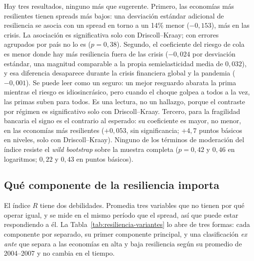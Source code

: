 Hay tres resultados, ninguno más que sugerente. Primero, las economías más resilientes tienen spreads más bajos: una desviación estándar adicional de resiliencia se asocia con un spread en torno a un 14\% menor ($-0{,}153$), más en las crisis. La asociación es significativa solo con Driscoll--Kraay; con errores agrupados por país no lo es ($p=0{,}38$). Segundo, el coeficiente del riesgo de cola es menor donde hay más resiliencia fuera de las crisis ($-0{,}024$ por desviación estándar, una magnitud comparable a la propia semielasticidad media de $0{,}032$), y esa diferencia desaparece durante la crisis financiera global y la pandemia ($-0{,}001$). Se puede leer como un seguro: un mejor resguardo abarata la prima mientras el riesgo es idiosincrásico, pero cuando el choque golpea a todos a la vez, las primas suben para todos. Es una lectura, no un hallazgo, porque el contraste por régimen es significativo solo con Driscoll--Kraay. Tercero, para la fragilidad bancaria el signo es el contrario al esperado: su coeficiente es mayor, no menor, en las economías más resilientes ($+0{,}053$, sin significancia; $+4{,}7$ puntos básicos en niveles, solo con Driscoll--Kraay). Ninguno de los términos de moderación del índice resiste el \textit{wild bootstrap} sobre la muestra completa ($p=0{,}42$ y $0{,}46$ en logaritmos; $0{,}22$ y $0{,}43$ en puntos básicos).

\subsection{Qué componente de la resiliencia importa}
\label{sec:resiliencia-variantes}

El índice $R$ tiene dos debilidades. Promedia tres variables que no tienen por qué operar igual, y se mide en el mismo período que el spread, así que puede estar respondiendo a él. La Tabla~\ref{tab:resiliencia-variantes} lo abre de tres formas: cada componente por separado, su primer componente principal, y una clasificación \emph{ex ante} que separa a las economías en alta y baja resiliencia según su promedio de 2004--2007 y no cambia en el tiempo.

